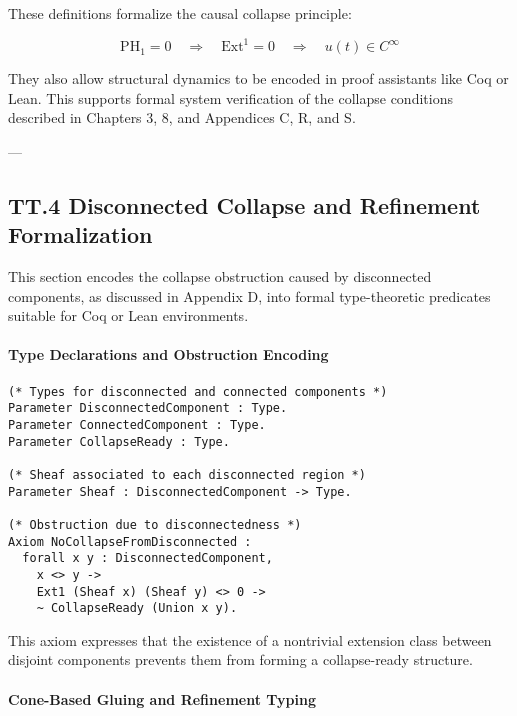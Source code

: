 \documentclass[11pt]{article}
\begin{document}
These definitions formalize the causal collapse principle:

\[
\mathrm{PH}_1 = 0 \quad \Rightarrow \quad \mathrm{Ext}^1 = 0 \quad \Rightarrow \quad u(t) \in C^\infty
\]

They also allow structural dynamics to be encoded in proof assistants like Coq or Lean.  
This supports formal system verification of the collapse conditions described in Chapters 3, 8, and Appendices C, R, and S.

---

\subsection*{TT.4 Disconnected Collapse and Refinement Formalization}

This section encodes the collapse obstruction caused by disconnected components,  
as discussed in Appendix D, into formal type-theoretic predicates suitable for Coq or Lean environments.

\paragraph{Type Declarations and Obstruction Encoding}

\begin{adjustwidth}{0em}{0em}  %
\begin{lstlisting}[language=Coq]
(* Types for disconnected and connected components *)
Parameter DisconnectedComponent : Type.
Parameter ConnectedComponent : Type.
Parameter CollapseReady : Type.

(* Sheaf associated to each disconnected region *)
Parameter Sheaf : DisconnectedComponent -> Type.

(* Obstruction due to disconnectedness *)
Axiom NoCollapseFromDisconnected :
  forall x y : DisconnectedComponent,
    x <> y ->
    Ext1 (Sheaf x) (Sheaf y) <> 0 ->
    ~ CollapseReady (Union x y).
\end{lstlisting}
\end{adjustwidth}


This axiom expresses that the existence of a nontrivial extension class between disjoint components  
prevents them from forming a collapse-ready structure.

\paragraph{Cone-Based Gluing and Refinement Typing}
\end{document}
